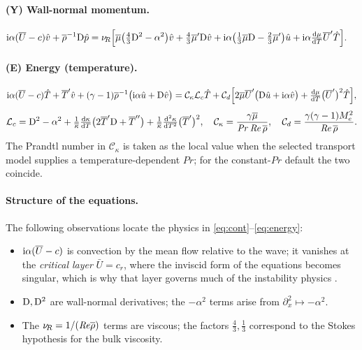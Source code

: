 \documentclass[11pt]{article}
\begin{document}
\paragraph{(Y) Wall-normal momentum.}
\begin{equation}\label{eq:ymom}
\begin{aligned}
  \mathrm{i}\alpha(\overline{U}-c)\hat{v}+\overline{\rho}^{-1}\mathrm{D}\hat{p}
  =\nu_{\!R}\Big[&\overline{\mu}\big(\tfrac43\mathrm{D}^2-\alpha^2\big)\hat{v}+\tfrac43\overline{\mu}'\mathrm{D}\hat{v}
   +\mathrm{i}\alpha\big(\tfrac13\overline{\mu}\mathrm{D}-\tfrac23\overline{\mu}'\big)\hat{u}
   +\mathrm{i}\alpha\tfrac{\mathrm d\mu}{\mathrm dT}\overline{U}'\hat{T}\Big] .
\end{aligned}
\end{equation}

\paragraph{(E) Energy (temperature).}
\begin{equation}\label{eq:energy}
  \mathrm{i}\alpha(\overline{U}-c)\hat{T}+\overline{T}'\hat{v}+(\gamma-1)\overline{\rho}^{-1}\big(\mathrm{i}\alpha\hat{u}+\mathrm{D}\hat{v}\big)
  =\mathcal C_\kappa\mathcal L_c\hat{T}
   +\mathcal C_d\Big[2\overline{\mu}\overline{U}'\big(\mathrm{D}\hat{u}+\mathrm{i}\alpha\hat{v}\big)
     +\tfrac{\mathrm d\mu}{\mathrm dT}\big(\overline{U}'\big)^2\hat{T}\Big],
\end{equation}
\begin{equation}\label{eq:egroups}
  \mathcal L_c=\mathrm{D}^2-\alpha^2
   +\tfrac1{\overline{\kappa}}\tfrac{\mathrm d\kappa}{\mathrm dT}\big(2\overline{T}'\mathrm{D}+\overline{T}''\big)
   +\tfrac1{\overline{\kappa}}\tfrac{\mathrm d^2\kappa}{\mathrm dT^2}\big(\overline{T}'\big)^2,\quad
  \mathcal C_\kappa=\frac{\gamma\overline{\mu}}{\mathit{Pr}\,\mathit{Re}\,\overline{\rho}},\quad
  \mathcal C_d=\frac{\gamma(\gamma-1)M_e^2}{\mathit{Re}\,\overline{\rho}}.
\end{equation}
The Prandtl number in $\mathcal C_\kappa$ is taken as the local value when the selected
transport model supplies a temperature-dependent $\mathit{Pr}$; for the constant-$\mathit{Pr}$
default the two coincide.

\paragraph{Structure of the equations.} The following observations locate the physics in
\eqref{eq:cont}--\eqref{eq:energy}:
\begin{itemize}[nosep,leftmargin=1.6em]
  \item $\mathrm{i}\alpha(\overline{U}-c)$ is convection by the mean flow relative to the wave; it vanishes at the
        \emph{critical layer} $\bar U=c_r$, where the inviscid form of the equations becomes singular,
        which is why that layer governs much of the instability physics \cite{mack1984}.
  \item $\mathrm{D},\mathrm{D}^2$ are wall-normal derivatives; the $-\alpha^2$ terms arise from
        $\partial_x^2\mapsto-\alpha^2$.
  \item The $\nu_{\!R}=1/(\mathit{Re}\overline{\rho})$ terms are viscous; the factors $\tfrac43,\tfrac13$ correspond to the
        Stokes hypothesis for the bulk viscosity.
\end{itemize}
\end{document}
